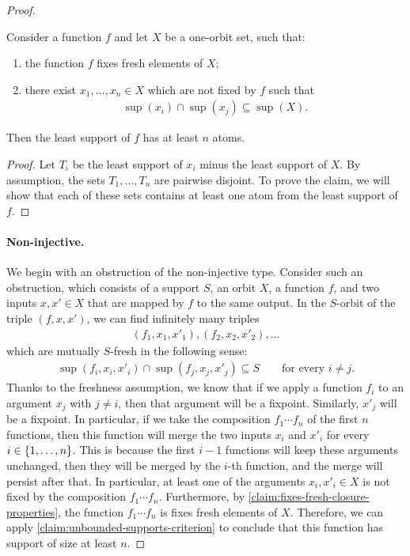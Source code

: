 \begin{proof}
\begin{claim}\label{claim:unbounded-supports-criterion}
    Consider a function $f$ and let $X$ be a one-orbit set, such that: 
    \begin{enumerate}
        \item the function $f$ fixes fresh elements of $X$;
        \item there exist  $x_1,\ldots,x_n \in X$ which are not fixed by $f$ such that 
         \begin{align*}
        \sup(x_i) \cap \sup(x_j) \subseteq \sup(X).
        \end{align*}
    \end{enumerate}
    Then the least support of $f$ has at least $n$ atoms. 
\end{claim}
\begin{proof}
    Let $T_i$ be the least support of $x_i$ minus the least support of $X$. By assumption, the sets $T_1,\ldots,T_n$ are pairwise disjoint. To prove the claim, we  will show that each of these sets contains at least one atom from the least support of $f$. 
\end{proof}




\paragraph*{Non-injective.}
We begin with an obstruction of the non-injective type.
Consider such an obstruction, which consists of a support $S$, an orbit $X$, a function $f$, and two inputs $x,x' \in X$ that are mapped by $f$ to the same output. In the $S$-orbit of the triple $(f,x,x')$, we  can find infinitely many triples
    \begin{align*}
    (f_1,x_1,x'_1), (f_2,x_2,x'_2), \ldots
    \end{align*}
which are mutually $S$-fresh in the following sense: 
\begin{align*}
\sup(f_i,x_i,x'_i) \cap \sup(f_j,x_j,x'_j) \subseteq S \qquad \text{for every } i \neq j.
\end{align*}
Thanks to the freshness assumption, we know that if we apply a function $f_i$ to an argument $x_j$ with $j \neq i$, then that argument will be a fixpoint. Similarly, $x'_j$ will be a fixpoint. In particular, if we take the composition $f_1 \cdots f_n$ of the first $n$ functions, then this function will merge the two inputs $x_i$ and $x'_i$ for every $i \in \{1,\ldots,n\}$. This is because the first $i-1$ functions will keep these arguments unchanged, then they will be merged by the $i$-th function, and the merge will persist after that. In particular, at least one of  the arguments $x_i,x'_i \in X$ is not fixed by  the composition $f_1 \cdots f_n$. Furthermore, by \cref{claim:fixes-fresh-closure-properties}, the function $f_1 \cdots f_n$ is fixes fresh elements of $X$. Therefore, we can apply \cref{claim:unbounded-supports-criterion} to conclude that this function has support of size at least $n$. 


\end{proof}
